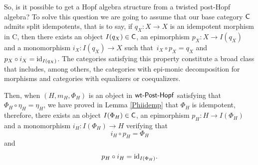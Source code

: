 \documentclass[pdftex]{sigma}
\numberwithin{equation}{section}
\begin{document}
So, is it possible to get a Hopf algebra structure from a twisted post-Hopf algebra? To solve this question we are going to assume that our base category $\sf{C}$ admits split idempotents, that is to say, if $q_{X}\colon X\rightarrow X$ is an idempotent morphism in {\sf C}, then there exists an object $I(q_{X})\in\sf{C}$, an epimorphism $p_{X}\colon X\rightarrow I(q_{X})$ and a monomorphism $i_{X}\colon I(q_{X})\rightarrow X$ such that~${i_{X}\circ p_{X}=q_{X}}$ and~${p_{X}\circ i_{X}={\rm id}_{I(q_{X})}}$. The categories satisfying this property constitute a broad class that includes, among others, the categories with epi-monic decomposition for morphisms and categories with equalizers or coequalizers.

Then, when $(H,m_{H},\Phi_{H})$ is an object in ${\sf wt}\textnormal{-}\sf{Post}\textnormal{-}\sf{Hopf}$ satisfying that $\Phi_{H}\circ\eta_{H}=\eta_{H}$, we have proved in Lemma \ref{Phiidemp} that $\Phi_{H}$ is idempotent, therefore, there exists an object $I(\Phi_{H})\in\sf{C}$, an epimorphism $p_{H}\colon H\rightarrow I(\Phi_{H})$ and a monomorphism $i_{H}\colon I(\Phi_{H})\rightarrow H$ verifying that
\begin{equation}\label{iconp}
i_{H}\circ p_{H}=\Phi_{H}
\end{equation}
and
\begin{equation}\label{pconi}
p_{H}\circ i_{H}={\rm id}_{I(\Phi_{H})}.
\end{equation}
\end{document}
